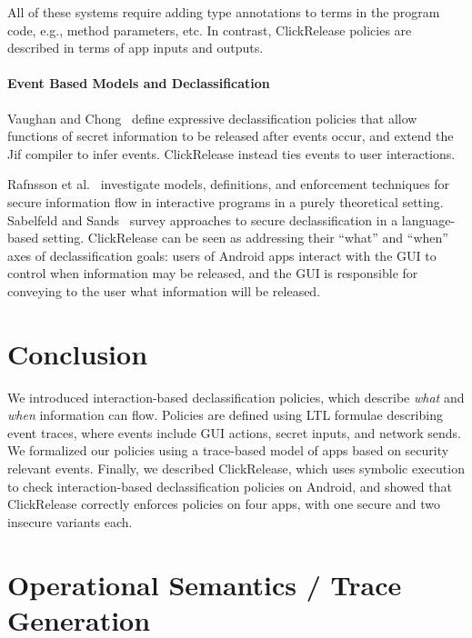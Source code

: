 \documentclass{llncs}
\newcommand{\toolname}{ClickRelease\xspace}
\begin{document}
All of these systems require adding type annotations to terms in the
program code, e.g., method parameters, etc. In contrast, \toolname{}
policies are described in terms of app inputs and
outputs.

\paragraph*{Event Based Models and Declassification}

Vaughan and Chong~\cite{Vaughan:2011} define expressive declassification policies that
allow functions of secret information to be released after events occur, and
extend the Jif compiler to infer events.  \toolname instead 
ties events to user interactions.

Rafnsson et al.~\cite{Rafnsson:12} investigate models, definitions, and enforcement
techniques for secure information flow in interactive programs in a
purely theoretical setting.
%
Sabelfeld and Sands~\cite{Sabelfeld:2009} survey approaches to
secure declassification in a language-based setting.  \toolname
can be seen as addressing their ``what'' and ``when'' axes of
declassification goals:  users of Android apps interact with the GUI
to control when information may be released, and the GUI is responsible
for conveying to the user what information will be released.

\section{Conclusion}
\label{sec:conclusion}

We introduced interaction-based declassification policies, which describe
\emph{what} and \emph{when} information can flow. Policies are defined
using LTL formulae describing event traces, where events include GUI
actions, secret inputs, and network sends. We formalized our policies
using a trace-based model of apps based on security relevant events.
Finally, we described \toolname{}, which uses symbolic
execution to check interaction-based declassification policies on Android, and
showed that \toolname{} correctly enforces policies on four apps,
with one secure and two insecure variants each.




\appendix 

\section{Operational Semantics / Trace Generation}
\label{sec:semantics}
\end{document}
